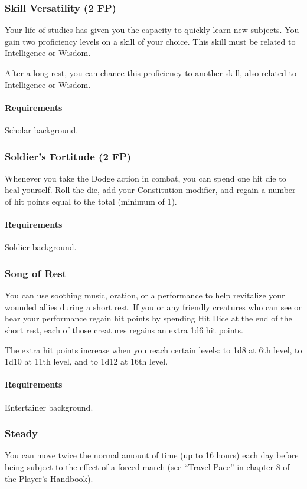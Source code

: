 \subsubsection{Skill Versatility (2 FP)} \label{feat::skillversatility}
    Your life of studies has given you the capacity to quickly learn new subjects.
    You gain two proficiency levels on a skill of your choice.
    This skill must be related to Intelligence or Wisdom.

    After a long rest, you can chance this proficiency to another skill, also related to Intelligence or Wisdom.
    \paragraph{Requirements} Scholar background.
\subsubsection{Soldier's Fortitude (2 FP)} \label{feat::soldiersfortitude}
    Whenever you take the Dodge action in combat, you can spend one hit die to heal yourself.
    Roll the die, add your Constitution modifier, and regain a number of hit points equal to the total (minimum of 1).
    \paragraph{Requirements} Soldier background.
\subsubsection{Song of Rest} \label{feat::songofrest}
    You can use soothing music, oration, or a performance to help revitalize your wounded allies during a short rest.
    If you or any friendly creatures who can see or hear your performance regain hit points by spending Hit Dice at the end of the short rest, each of those creatures regains an extra 1d6 hit points.

    The extra hit points increase when you reach certain levels: to 1d8 at 6th level, to 1d10 at 11th level, and to 1d12 at 16th level.
    \paragraph{Requirements} Entertainer background.
\subsubsection{Steady} \label{feat::steady}
    You can move twice the normal amount of time (up to 16 hours) each day before being subject to the effect of a forced march (see ``Travel Pace'' in chapter 8 of the Player's Handbook).
